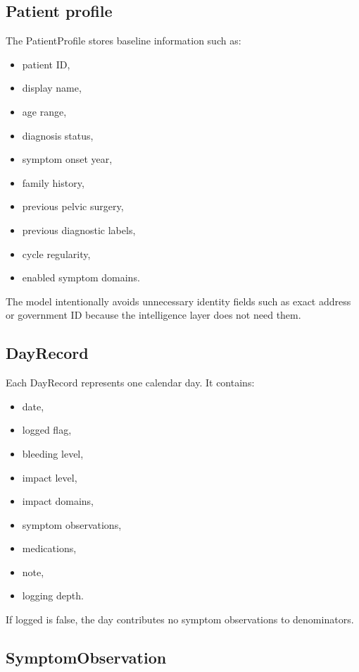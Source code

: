 \documentclass[11pt,a4paper]{article}
\begin{document}
\subsection{Patient profile}

The PatientProfile stores baseline information such as:

\begin{itemize}
  \item patient ID,
  \item display name,
  \item age range,
  \item diagnosis status,
  \item symptom onset year,
  \item family history,
  \item previous pelvic surgery,
  \item previous diagnostic labels,
  \item cycle regularity,
  \item enabled symptom domains.
\end{itemize}

The model intentionally avoids unnecessary identity fields such as exact address or government ID because the intelligence layer does not need them.

\subsection{DayRecord}

Each DayRecord represents one calendar day. It contains:

\begin{itemize}
  \item date,
  \item logged flag,
  \item bleeding level,
  \item impact level,
  \item impact domains,
  \item symptom observations,
  \item medications,
  \item note,
  \item logging depth.
\end{itemize}

If logged is false, the day contributes no symptom observations to denominators.

\subsection{SymptomObservation}
\end{document}
